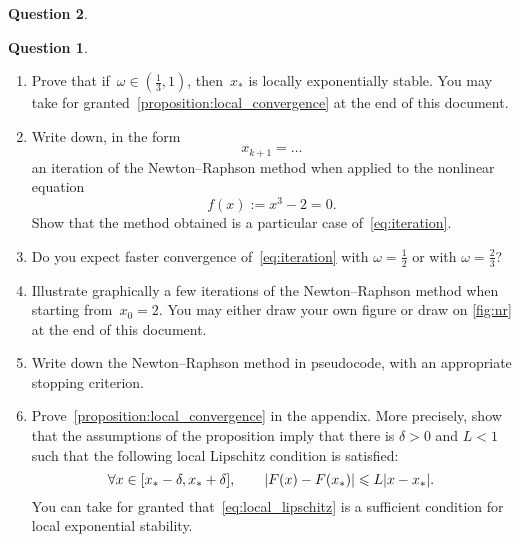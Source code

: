 \documentclass[11pt]{article}
\theoremstyle{definition}
\newtheorem{question}{Question}
\theoremstyle{remark}
\theoremstyle{plain}%
\begin{document}
\begin{question}
\begin{question}
\begin{enumerate}
        \item
            Prove that if~$\omega \in \left(\frac{1}{3}, 1\right)$,
            then~$x_*$ is locally exponentially stable.
            You may take for granted~\cref{proposition:local_convergence} at the end of this document.


        \item
            Write down, in the form
            \[
                x_{k+1} = \dots
            \]
            an iteration of the Newton--Raphson method when applied to the nonlinear equation
            \[
                f(x) := x^3 - 2 = 0.
            \]
            Show that the method obtained is a particular case of~\eqref{eq:iteration}.

        \item
            \mymark
            Do you expect faster convergence of~\eqref{eq:iteration} with $\omega = \frac{1}{2}$ or with $\omega = \frac{2}{3}$?

        \item
            Illustrate graphically a few iterations of the Newton--Raphson method when starting from~$x_0 = 2$.
            You may either draw your own figure or draw on \cref{fig:nr} at the end of this document.

        \item
            Write down the Newton--Raphson method in pseudocode,
            with an appropriate stopping criterion.

        \item
            Prove~\cref{proposition:local_convergence} in the appendix.
            More precisely, show that the assumptions of the proposition imply that there is $\delta > 0$ and $L < 1$ such that the following local Lipschitz condition is satisfied:
            \begin{equation}
                \label{eq:local_lipschitz}
                \forall x \in [x_* - \delta, x_* + \delta],
                \qquad
                \lvert F(x) - F(x_*) \rvert \leqslant L \lvert x - x_*\rvert.
            \end{equation}
            You can take for granted that~\eqref{eq:local_lipschitz} is a sufficient condition for local exponential stability.



\end{enumerate}
\end{question}
\end{question}
\end{document}
